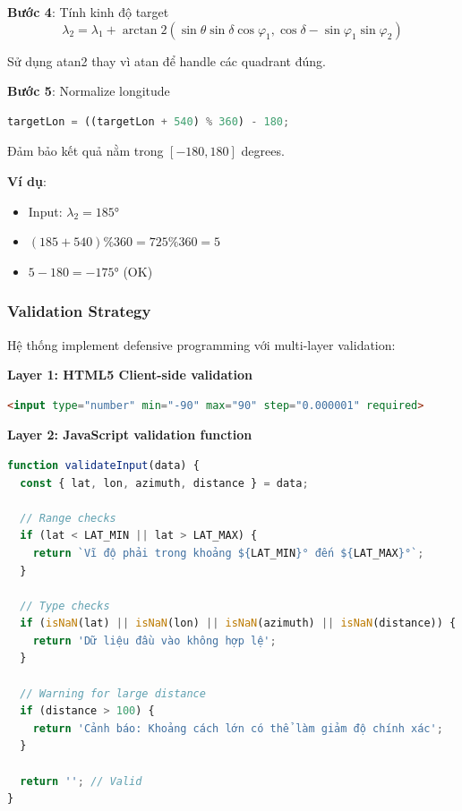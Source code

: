 \textbf{Bước 4}: Tính kinh độ target
\begin{equation}
\lambda_2 = \lambda_1 + \arctan2(\sin\theta \sin\delta \cos\varphi_1, \cos\delta - \sin\varphi_1 \sin\varphi_2)
\end{equation}

Sử dụng atan2 thay vì atan để handle các quadrant đúng.

\textbf{Bước 5}: Normalize longitude
\begin{lstlisting}[language=JavaScript]
targetLon = ((targetLon + 540) % 360) - 180;
\end{lstlisting}

Đảm bảo kết quả nằm trong $[-180, 180]$ degrees.

\textbf{Ví dụ}:
\begin{itemize}
    \item Input: $\lambda_2 = 185°$
    \item $(185 + 540) \% 360 = 725 \% 360 = 5$
    \item $5 - 180 = -175°$ (OK)
\end{itemize}

\subsubsection{Validation Strategy}

Hệ thống implement defensive programming với multi-layer validation:

\textbf{Layer 1: HTML5 Client-side validation}
\begin{lstlisting}[language=HTML]
<input type="number" min="-90" max="90" step="0.000001" required>
\end{lstlisting}

\textbf{Layer 2: JavaScript validation function}
\begin{lstlisting}[language=JavaScript]
function validateInput(data) {
  const { lat, lon, azimuth, distance } = data;
  
  // Range checks
  if (lat < LAT_MIN || lat > LAT_MAX) {
    return `Vĩ độ phải trong khoảng ${LAT_MIN}° đến ${LAT_MAX}°`;
  }
  
  // Type checks
  if (isNaN(lat) || isNaN(lon) || isNaN(azimuth) || isNaN(distance)) {
    return 'Dữ liệu đầu vào không hợp lệ';
  }
  
  // Warning for large distance
  if (distance > 100) {
    return 'Cảnh báo: Khoảng cách lớn có thể làm giảm độ chính xác';
  }
  
  return ''; // Valid
}
\end{lstlisting}

